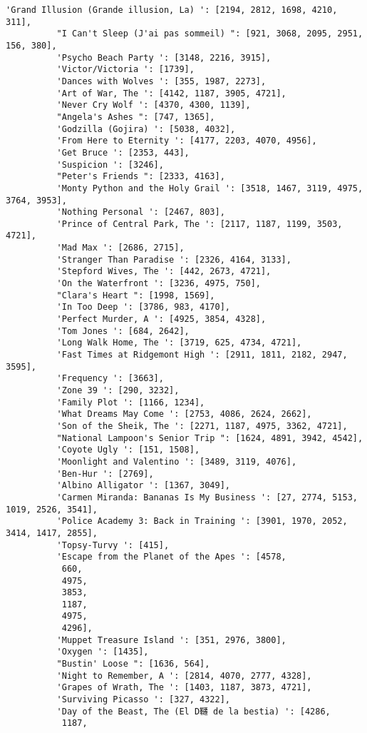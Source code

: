 \documentclass[11pt]{article}
\begin{document}
\begin{Verbatim}[commandchars=\\\{\}]
          'Grand Illusion (Grande illusion, La) ': [2194, 2812, 1698, 4210, 311],
          "I Can't Sleep (J'ai pas sommeil) ": [921, 3068, 2095, 2951, 156, 380],
          'Psycho Beach Party ': [3148, 2216, 3915],
          'Victor/Victoria ': [1739],
          'Dances with Wolves ': [355, 1987, 2273],
          'Art of War, The ': [4142, 1187, 3905, 4721],
          'Never Cry Wolf ': [4370, 4300, 1139],
          "Angela's Ashes ": [747, 1365],
          'Godzilla (Gojira) ': [5038, 4032],
          'From Here to Eternity ': [4177, 2203, 4070, 4956],
          'Get Bruce ': [2353, 443],
          'Suspicion ': [3246],
          "Peter's Friends ": [2333, 4163],
          'Monty Python and the Holy Grail ': [3518, 1467, 3119, 4975, 3764, 3953],
          'Nothing Personal ': [2467, 803],
          'Prince of Central Park, The ': [2117, 1187, 1199, 3503, 4721],
          'Mad Max ': [2686, 2715],
          'Stranger Than Paradise ': [2326, 4164, 3133],
          'Stepford Wives, The ': [442, 2673, 4721],
          'On the Waterfront ': [3236, 4975, 750],
          "Clara's Heart ": [1998, 1569],
          'In Too Deep ': [3786, 983, 4170],
          'Perfect Murder, A ': [4925, 3854, 4328],
          'Tom Jones ': [684, 2642],
          'Long Walk Home, The ': [3719, 625, 4734, 4721],
          'Fast Times at Ridgemont High ': [2911, 1811, 2182, 2947, 3595],
          'Frequency ': [3663],
          'Zone 39 ': [290, 3232],
          'Family Plot ': [1166, 1234],
          'What Dreams May Come ': [2753, 4086, 2624, 2662],
          'Son of the Sheik, The ': [2271, 1187, 4975, 3362, 4721],
          "National Lampoon's Senior Trip ": [1624, 4891, 3942, 4542],
          'Coyote Ugly ': [151, 1508],
          'Moonlight and Valentino ': [3489, 3119, 4076],
          'Ben-Hur ': [2769],
          'Albino Alligator ': [1367, 3049],
          'Carmen Miranda: Bananas Is My Business ': [27, 2774, 5153, 1019, 2526, 3541],
          'Police Academy 3: Back in Training ': [3901, 1970, 2052, 3414, 1417, 2855],
          'Topsy-Turvy ': [415],
          'Escape from the Planet of the Apes ': [4578,
           660,
           4975,
           3853,
           1187,
           4975,
           4296],
          'Muppet Treasure Island ': [351, 2976, 3800],
          'Oxygen ': [1435],
          "Bustin' Loose ": [1636, 564],
          'Night to Remember, A ': [2814, 4070, 2777, 4328],
          'Grapes of Wrath, The ': [1403, 1187, 3873, 4721],
          'Surviving Picasso ': [327, 4322],
          'Day of the Beast, The (El D韆 de la bestia) ': [4286,
           1187,

\end{Verbatim}
\end{document}
